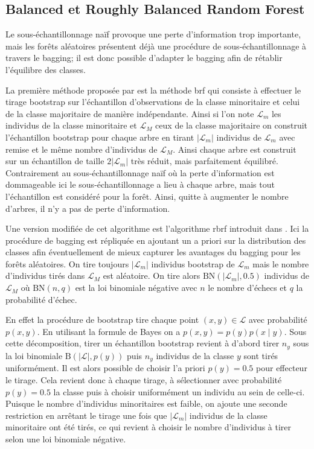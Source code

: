 \subsection{Balanced et Roughly Balanced Random Forest}

Le sous-échantillonnage naïf provoque une perte d'information trop importante, mais les forêts aléatoires présentent déjà une procédure de sous-échantillonnage à travers le \ac{bagging}; il est donc possible d'adapter le \ac{bagging} afin de rétablir l'équilibre des classes.

La première méthode proposée par \citet{Breiman2001} est la méthode \ac{brf} qui consiste à effectuer le tirage bootstrap sur l'échantillon d'observations de la classe minoritaire et celui de la classe majoritaire de manière indépendante. Ainsi si l'on note $\mathcal{L}_m$ les individus de la classe minoritaire et $\mathcal{L}_M$ ceux de la classe majoritaire on construit l'échantillon bootstrap pour chaque arbre en tirant $\vert \mathcal{L}_m \vert $ individus de $\mathcal{L}_m$ avec remise et le même nombre d'individus de $\mathcal{L}_M$. Ainsi chaque arbre est construit sur un échantillon de taille $2  \vert \mathcal{L}_m \vert$ très réduit, mais parfaitement équilibré. Contrairement au sous-échantillonnage naïf où la perte d'information est dommageable ici le sous-échantillonnage a lieu à chaque arbre, mais tout l'échantillon est considéré pour la forêt. Ainsi, quitte à augmenter le nombre d'arbres, il n'y a pas de perte d'information.

Une version modifiée de cet algorithme est l'algorithme \ac{rbrf} introduit dans \citet{Hido2009b}. Ici la procédure de \ac{bagging} est répliquée en ajoutant un a priori sur la distribution des classes afin éventuellement de mieux capturer les avantages du \ac{bagging} pour les forêts aléatoires. On tire toujours $\vert \mathcal{L}_m \vert $ individus bootstrap de $\mathcal{L}_m$ mais le nombre d'individus tirés dans $\mathcal{L}_M$ est aléatoire. On tire alors $ \mathrm{BN} ( \vert \mathcal{L}_m \vert , 0.5 ) $ individus de $\mathcal{L}_M$ où $\mathrm{BN}(n,q)$ est la loi binomiale négative avec $n$ le nombre d'échecs et $q$ la probabilité d'échec.

En effet la procédure de bootstrap tire chaque point $(x,y) \in \mathcal{L}$ avec probabilité $p(x,y)$. En utilisant la formule de Bayes on a $p(x,y) = p(y) p(x \mid y )$. Sous cette décomposition, tirer un échantillon bootstrap revient à d'abord tirer $n_y$ sous la loi binomiale $\mathrm{B} ( \vert \mathcal{L} \vert , p(y) )$ puis $n_y$ individus de la classe $y$ sont tirés uniformément.  Il est alors possible de choisir l'a priori $p(y) = 0.5$ pour effecteur le tirage. Cela revient donc à chaque tirage, à sélectionner avec probabilité $p(y) = 0.5$ la classe puis à choisir uniformément un individu au sein de celle-ci. Puisque le nombre d'individus minoritaires est faible, on ajoute une seconde restriction en arrêtant le tirage une fois que $\vert \mathcal{L}_m \vert$ individus de la classe minoritaire ont été tirés, ce qui revient à choisir le nombre d'individus à tirer selon une loi binomiale négative. 


